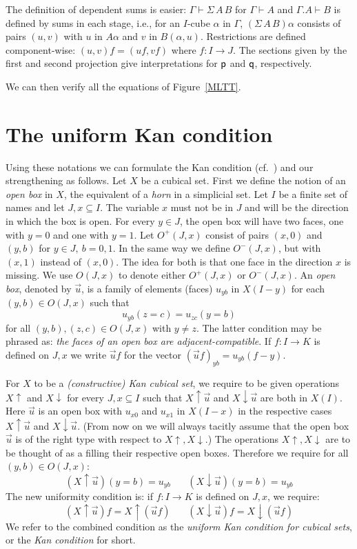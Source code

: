 \documentclass[10pt,a4paper]{article}
\newcommand{\pp}{{\sf p}}
\newcommand{\qq}{{\sf q}}
\newcommand{\rup}[1]{#1{\uparrow}}
\newcommand{\rdo}[1]{#1{\downarrow}}
\begin{document}
The definition of dependent sums is easier: $\Gamma\vdash\Sigma\,A\,B$
for $\Gamma \vdash A$ and $\Gamma.A \vdash B$ is defined by sums in
each stage, i.e., for an $I$-cube $\alpha$ in $\Gamma$,
$(\Sigma\,A\,B)\alpha$ consists of pairs $(u,v)$ with $u$ in $A
\alpha$ and $v$ in $B (\alpha, u)$.  Restrictions are defined
component-wise: $(u,v)f = (u f, v f)$ where $f \colon I \to J$.  The
sections given by the first and second projection give interpretations
for $\pp$ and $\qq$, respectively.

We can then verify all the equations of Figure~\ref{MLTT}.

\section{The uniform Kan condition}

Using these notations we can formulate the Kan condition (cf.\
\cite{Kan}) and our strengthening as follows. Let $X$ be a cubical
set.  First we define the notion of an \emph{open box} in $X$, the
equivalent of a \emph{horn} in a simplicial set.  Let $I$ be a finite
set of names and let $J,x \subseteq I$.  The variable $x$ must not be
in $J$ and will be the direction in which the box is open.  For every
$y\in J$, the open box will have two faces, one with $y=0$ and one
with $y=1$.  Let $O^+(J,x)$ consist of pairs $(x,0)$ and $(y,b)$ for
$y\in J,~b=0,1$.  In the same way we define $O^-(J,x)$, but with
$(x,1)$ instead of $(x,0)$.  The idea for both is that one face in the
direction $x$ is missing.  We use $O(J,x)$ to denote either $O^+(J,x)$
or $O^-(J,x)$.  An \emph{open box}, denoted by $\vec u$, is a family
of elements (faces) $u_{yb}$ in $X(I-y)$ for each $(y,b)\in O(J,x)$
such that
$$u_{yb}(z = c) = u_{zc}(y = b)$$
for all $(y,b),(z,c)\in O(J,x)$ with $y\neq z$.  The latter condition
may be phrased as: \emph{the faces of an open box are
  adjacent-compatible}.  If $f:I\to K$ is defined on $J,x$ we write
$\vec u f$ for the vector $(\vec u f)_{yb} = u_{yb} (f-y)$.

For $X$ to be a \emph{(constructive) Kan cubical set}, we require to
be given operations $\rup{X}$ and $\rdo{X}$ for every $J,x\subseteq I$
such that $\rup{X} \vec u$ and $\rdo{X} \vec u$ are both in $X(I)$.
Here $\vec u$ is an open box with $u_{x0}$ and $u_{x1}$ in $X(I-x)$ in
the respective cases $\rup{X} \vec u$ and $\rdo{X} \vec u$. (From now
on we will always tacitly assume that the open box $\vec u$ is of the
right type with respect to $\rup{X},\rdo{X}$.)  The operations
$\rup{X},\rdo{X}$ are to be thought of as a filling their respective
open boxes. Therefore we require for all $(y,b)\in O(J,x)$:
$$
(\rup{X} \vec u) (y=b) = u_{yb}~~~~~~~~(\rdo{X} \vec u) (y=b) = u_{yb}
$$
The new uniformity condition is: if $f:I\to K$ is defined on $J,x$, we
require:
$$
(\rup{X} \vec u) f = \rup{X} (\vec{u}f)~~~~~~~~(\rdo{X} \vec u) f = \rdo{X} (\vec{u}f)
$$
We refer to the combined condition as the \emph{uniform Kan condition
  for cubical sets}, or the \emph{Kan condition} for
short. %
\end{document}
